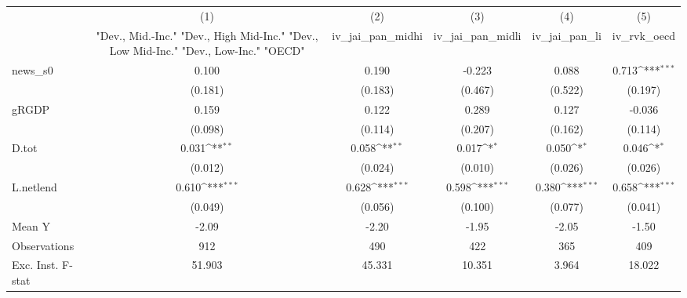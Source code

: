 {
\def\sym#1{\ifmmode^{#1}\else\(^{#1}\)\fi}
\begin{tabular}{l*{5}{c}}
\toprule
            &\multicolumn{1}{c}{(1)}&\multicolumn{1}{c}{(2)}&\multicolumn{1}{c}{(3)}&\multicolumn{1}{c}{(4)}&\multicolumn{1}{c}{(5)}\\
            &\multicolumn{1}{c}{ "Dev., Mid.-Inc." "Dev., High Mid-Inc." "Dev., Low Mid-Inc." "Dev., Low-Inc." "OECD" }&\multicolumn{1}{c}{iv\_jai\_pan\_midhi}&\multicolumn{1}{c}{iv\_jai\_pan\_midli}&\multicolumn{1}{c}{iv\_jai\_pan\_li}&\multicolumn{1}{c}{iv\_rvk\_oecd}\\
\midrule
news\_s0     &       0.100         &       0.190         &      -0.223         &       0.088         &       0.713\sym{***}\\
            &     (0.181)         &     (0.183)         &     (0.467)         &     (0.522)         &     (0.197)         \\
\addlinespace
gRGDP       &       0.159         &       0.122         &       0.289         &       0.127         &      -0.036         \\
            &     (0.098)         &     (0.114)         &     (0.207)         &     (0.162)         &     (0.114)         \\
\addlinespace
D.tot       &       0.031\sym{**} &       0.058\sym{**} &       0.017\sym{*}  &       0.050\sym{*}  &       0.046\sym{*}  \\
            &     (0.012)         &     (0.024)         &     (0.010)         &     (0.026)         &     (0.026)         \\
\addlinespace
L.netlend   &       0.610\sym{***}&       0.628\sym{***}&       0.598\sym{***}&       0.380\sym{***}&       0.658\sym{***}\\
            &     (0.049)         &     (0.056)         &     (0.100)         &     (0.077)         &     (0.041)         \\
\midrule
Mean Y      &       -2.09         &       -2.20         &       -1.95         &       -2.05         &       -1.50         \\
Observations&         912         &         490         &         422         &         365         &         409         \\
Exc. Inst. F-stat&      51.903         &      45.331         &      10.351         &       3.964         &      18.022         \\
\bottomrule
\end{tabular}
}
